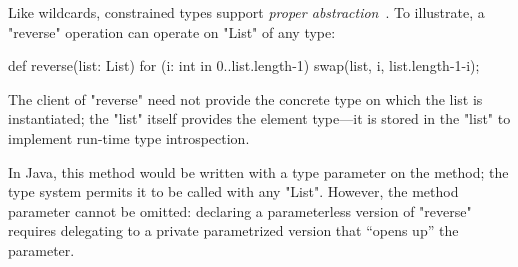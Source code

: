 
Like wildcards,
constrained types support
\emph{proper abstraction}~\cite{adding-wildcards}.  To illustrate, a
\xcd"reverse"
operation can operate on \xcd"List" of any type:
{
\begin{xten}
def reverse(list: List) {
  for (i: int in 0..list.length-1)
    swap(list, i, list.length-1-i);
}
\end{xten}}

\noindent
The client of \xcd"reverse" need not provide the concrete type
on which the list is instantiated; the \xcd"list" itself
provides the element type---it is stored in the \xcd"list"
to implement run-time type introspection.

In Java, this method would be written with a type parameter on
the method; the type system permits it to be called with any
\xcd"List".
However,
the method parameter cannot be omitted: declaring a parameterless version
of \xcd"reverse" requires delegating to a private parametrized version that
``opens up'' the parameter.

%


